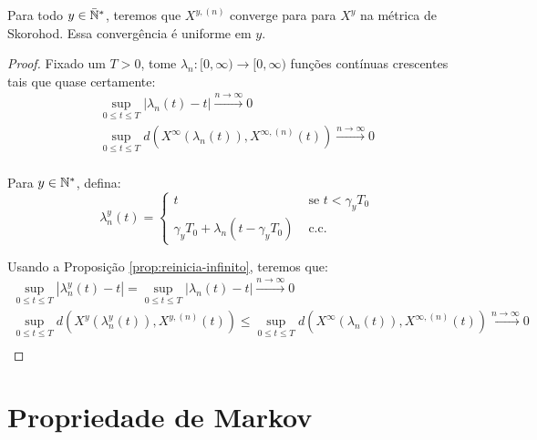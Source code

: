 \begin{corolario}
  \label{cor:convergencia}
  Para todo $y \in {\mathbb{\bar{N}^*}}$, teremos que  $X^{y, (n)}$ converge \qc para
  para $X^y$ na métrica de Skorohod. Essa convergência é uniforme em
  $y$.
\end{corolario}
\begin{proof}
  Fixado um $T > 0$, tome $\lambda_n: [0, \infty) \to [0, \infty)$
  funções contínuas crescentes tais que quase certamente:
  \begin{gather*}
    \sup_{0 \leq t \leq T} |\lambda_n(t) - t|
    \xrightarrow{n\to\infty} 0 \\
    \sup_{0 \leq t \leq T} d(X^\infty(\lambda_n(t)), X^{\infty, (n)}(t))
    \xrightarrow{n\to\infty} 0 \\
  \end{gather*}

  Para $y \in {\mathbb{N^*}}$, defina:
  \begin{displaymath}
    \lambda_n^y(t) = \begin{cases}
      t & \textrm{ se } t < \gamma_y T_0\\
      \gamma_yT_0 + \lambda_n(t - \gamma_y T_0) & \textrm{ c.c.}
    \end{cases}
  \end{displaymath}

  Usando a Proposição \ref{prop:reinicia-infinito}, teremos que:
 \begin{gather*}
   \sup_{0 \leq t \leq T} |\lambda_n^y(t) - t| =
    \sup_{0 \leq t \leq T} |\lambda_n(t) - t|
    \xrightarrow{n\to\infty} 0 \\
    \sup_{0 \leq t \leq T} d(X^y(\lambda_n^y(t)), X^{y, (n)}(t)) \leq
    \sup_{0 \leq t \leq T} d(X^\infty(\lambda_n(t)), X^{\infty, (n)}(t))
    \xrightarrow{n\to\infty} 0 \\
  \end{gather*}
\end{proof}


\section{Propriedade de Markov}
\label{sec:prop-markov}


